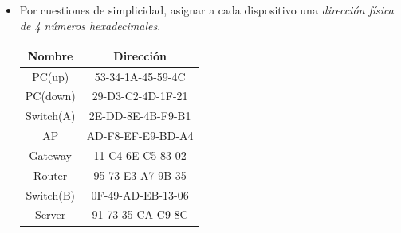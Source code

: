 \documentclass[spanish,12pt,letterpaper]{article}
\begin{document}
\begin{itemize}
\item Por cuestiones de simplicidad, asignar a cada dispositivo  una
  \textit{dirección física de 4 números hexadecimales}.

  \begin{table}[H]
    \centering
    \begin{tabular}{| c | c |}\hline
      Nombre & Dirección \\ \hline
      PC(up) & 53-34-1A-45-59-4C \\ \hline
      PC(down) & 29-D3-C2-4D-1F-21 \\ \hline
      Switch(A) & 2E-DD-8E-4B-F9-B1 \\ \hline
      AP & AD-F8-EF-E9-BD-A4 \\ \hline
      Gateway & 11-C4-6E-C5-83-02 \\ \hline
      Router & 95-73-E3-A7-9B-35 \\ \hline
      Switch(B) & 0F-49-AD-EB-13-06 \\ \hline
      Server & 91-73-35-CA-C9-8C \\ \hline
    \end{tabular}
  \end{table}  
  

\end{itemize}
\end{document}
